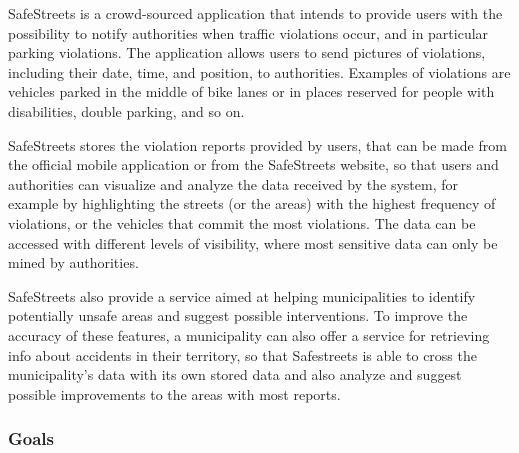 SafeStreets is a crowd-sourced application that intends to provide users with the possibility to notify authorities when traffic violations occur, and in particular parking violations. The application allows users to send pictures of violations, including their date, time, and position, to authorities. Examples of violations are vehicles parked in the middle of bike lanes or in places reserved for people with disabilities, double parking, and so on.

SafeStreets stores the violation reports provided by users, that can be made from the official mobile application or from the SafeStreets website, so that users and authorities can visualize and analyze the data received by the system, for example by highlighting the streets (or the areas) with the highest frequency of violations, or the vehicles that commit the most violations. The data can be accessed with different levels of visibility, where most sensitive data can only be mined by authorities.

SafeStreets also provide a service aimed at helping municipalities to identify potentially unsafe areas and suggest possible interventions. To improve the accuracy of these features, a municipality can also offer a service for retrieving info about accidents in their territory, so that Safestreets is able to cross the municipality's data with its own stored data and also analyze and suggest possible improvements to the areas with most reports.
\subsubsection{Goals}
\begin{enumerate}[label={G\arabic*.}]
     \label{G_report_auth}
     \label{G_store_cross_data}
     \label{G_interventions}
     \label{G_inst_registration}
     \label{G_visualization}
    \begin{enumerate}[label={G\arabic{enumi}.\arabic*.}]
    	 \label{G_visualization_cit}
    	 \label{G_visualization_auth}
    \end{enumerate}
	 \label{G_accept_reports}
	 \label{G_check_info}
\end{enumerate}
